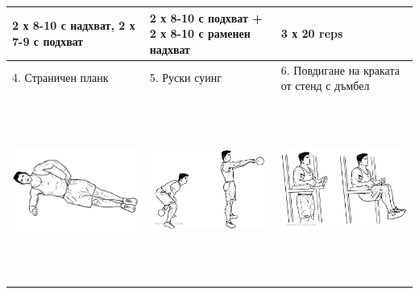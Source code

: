 \documentclass{article}
\begin{document}
\begin{tabular}{ | m{5cm} | m{5cm} | m{5cm} | }
2 х 8-10 с надхват, 2 х 7-9 с подхват & 2 х 8-10 с подхват + 2 х 8-10 с раменен надхват &  3 х 20 reps \\
\hline
4. Страничен планк  & 
5. Руски суинг & 
6. Повдигане на краката от стенд с дъмбел \\ 
\begin{minipage}{5cm} \includegraphics[width=\linewidth, height=60mm]{Side-Plank.png} \end{minipage} &
\begin{minipage}{5cm} \includegraphics[width=\linewidth, height=60mm]{Kettlebell-swings.png} \end{minipage} & 
\begin{minipage}{5cm} \includegraphics[width=\linewidth, height=60mm]{Knee_Hip_Raise.png} \end{minipage} \\ 

\end{tabular}
\end{document}
